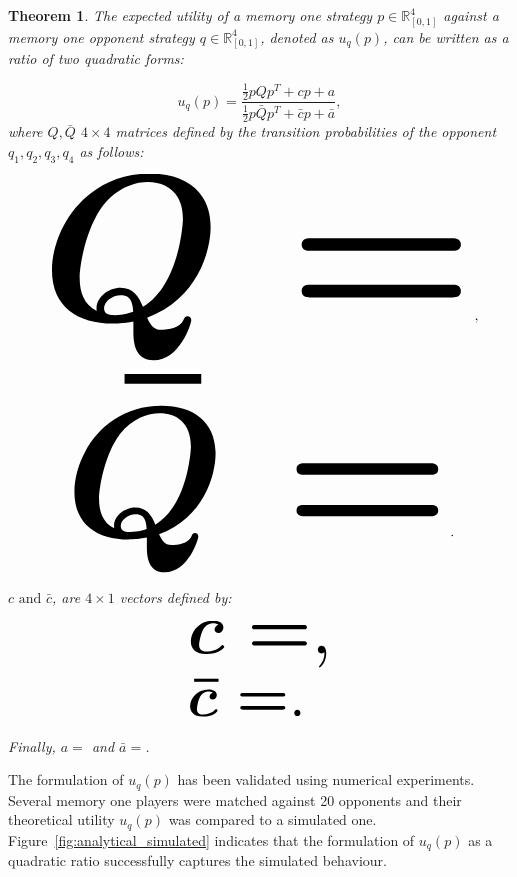 \documentclass[10pt]{article}
\newtheorem{theorem}{Theorem}
\begin{document}
\begin{theorem}\label{theorem:quadratic_form_u}
    The expected utility of a memory one strategy \(p\in\mathbb{R}_{[0,1]}^4\)
    against a memory one opponent strategy \(q\in\mathbb{R}_{[0,1]}^4\), denoted
    as \(u_q(p)\), can be written as a ratio of two quadratic forms:

    \begin{equation}\label{eq:optimisation_quadratic}
    u_q(p) = \frac{\frac{1}{2}pQp^T + cp + a}
                {\frac{1}{2}p\bar{Q}p^T + \bar{c}p + \bar{a}}, 
    \end{equation}
    where \(Q, \bar{Q}\) \(4 \times 4\) matrices defined by the transition
    probabilities of the opponent \(q_1, q_2, q_3, q_4\) as follows:
    
    \begin{center}
    \begin{equation}
    \resizebox{0.9\linewidth}{!}{\arraycolsep=2.5pt%
    \boldmath\(
    Q = \)},
    \end{equation}
    \begin{equation}\label{eq:q_bar_matrix}
    \resizebox{0.8\linewidth}{!}{\arraycolsep=2.5pt%
    \boldmath\(
    \bar{Q} =  \)}.
    \end{equation}
    \end{center}
    
    \(c \text{ and } \bar{c}\), are \(4 \times 1\) vectors defined by:
    
    \begin{equation}\label{eq:q_matrix_numerator}
    \resizebox{0.3\linewidth}{!}{\arraycolsep=2.5pt%
    \boldmath\(c = \),}
    \end{equation}
    \begin{equation}\label{eq:q_matrix_denominator}
    \resizebox{0.3\linewidth}{!}{\arraycolsep=2.5pt%
    \boldmath\(\bar{c} = \).
    }
    \end{equation}
    
    Finally, \(a = \) and 
    \(\bar{a} = \).
    \end{theorem}

The formulation of \(u_q(p)\) has been validated using numerical experiments.
Several memory one players were matched against 20 opponents and their theoretical
utility \(u_q(p)\) was compared to a simulated one. Figure~\ref{fig:analytical_simulated}
indicates that the  formulation of \(u_q(p)\) as a quadratic ratio successfully 
captures the simulated behaviour.
\end{document}
